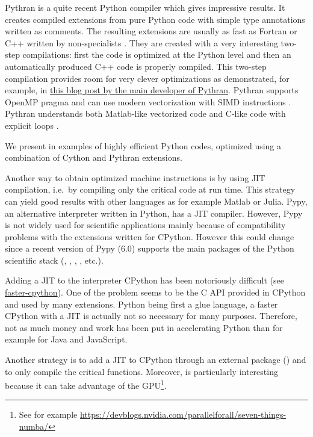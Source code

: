 Pythran \citep{guelton2015pythran, guelton2018pythran} is a quite recent Python
compiler which gives impressive results. It creates compiled extensions from pure
Python code with simple type annotations written as comments.
%
The resulting extensions are usually as fast as Fortran or C++ written by
non-specialists \citep[see, for example, benchmarks for the packages
 and ,][]{fluidfft, fluidsim}.
%
They are created with a very interesting two-step compilations: first the code
is optimized at the Python level and then an automatically produced C++ code is
properly compiled.
%
This two-step compilation provides room for very clever optimizations as
demonstrated, for example, in
\href{http://serge-sans-paille.github.io/pythran-stories/%
being-more-than-a-translator.html}{%
this blog post by the main developer of Pythran}.
%
Pythran supports OpenMP pragma \citep{guelton2013compiling} and can use modern
vectorization with SIMD instructions \citep{guelton2014exploring}. Pythran
understands both Matlab-like vectorized code and C-like code with explicit loops
\citep{guelton2018pythran}.

We present in \citet{fluidfft, fluidsim} examples of
highly efficient Python codes, optimized using a combination of Cython and
Pythran extensions.

 Another way to obtain optimized
machine instructions is by using JIT compilation, i.e.\ by compiling only the
critical code at run time.
%
This strategy can yield good results with other languages as for example Matlab
or Julia.
%
Pypy, an alternative interpreter written in Python, has a JIT compiler. However,
Pypy is not widely used for scientific applications mainly because of
compatibility problems with the extensions written for CPython.
%
However this could change since a recent version of Pypy (6.0) supports the main
packages of the Python scientific stack (\Numpy, \Scipy, ,
, etc.).

Adding a JIT to the interpreter CPython has been notoriously difficult (see
\href{https://faster-cpython.readthedocs.io/}{faster-cpython}). One of the
problem seems to be the C API provided in CPython and used by many extensions.
%
Python being first a glue language, a faster CPython with a JIT is actually not
so necessary for many purposes. Therefore, not as much money and work has been
put in accelerating Python than for example for Java and JavaScript.

Another strategy is to add a JIT to CPython through an external package
() and to only compile the critical functions.  Moreover,
 is particularly interesting because it can take advantage of the
GPU\footnote{See for example
\url{https://devblogs.nvidia.com/parallelforall/seven-things-numba/}}.


